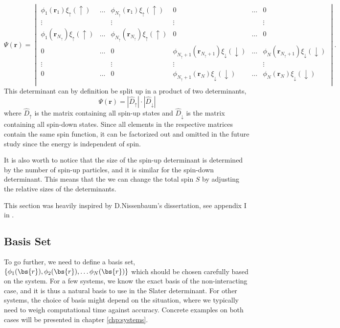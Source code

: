 \begin{equation*}
\Psi(\boldsymbol{r})=
\begin{vmatrix}
\phi_1(\boldsymbol{r}_1)\xi_{\uparrow}(\uparrow) & \hdots & \phi_{N_{\uparrow}}(\boldsymbol{r}_1)\xi_{\uparrow}(\uparrow) & 0 & \hdots & 0\\
\vdots & & \vdots & \vdots & & \vdots \\
\phi_1(\boldsymbol{r}_{N_{\uparrow}})\xi_{\uparrow}(\uparrow) & \hdots & \phi_{N_{\uparrow}}(\boldsymbol{r}_{N_{\uparrow}})\xi_{\uparrow}(\uparrow) & 0 & \hdots & 0\\
0 & \hdots & 0 & \phi_{N_{\uparrow}+1}(\boldsymbol{r}_{N_{\uparrow}+1})\xi_{\downarrow}(\downarrow) & \hdots & \phi_{N}(\boldsymbol{r}_{N_{\uparrow}+1})\xi_{\downarrow}(\downarrow)\\
\vdots & & \vdots & \vdots & & \vdots \\
0 & \hdots & 0 & \phi_{N_{\uparrow}+1}(\boldsymbol{r}_N)\xi_{\downarrow}(\downarrow) & \hdots & \phi_{N}(\boldsymbol{r}_N)\xi_{\downarrow}(\downarrow)\\
\end{vmatrix}.
\end{equation*}
This determinant can by definition be split up in a product of two determinants,
\begin{equation}
\Psi(\boldsymbol{r})=|\hat{D}_{\uparrow}|\cdot |\hat{D}_{\downarrow}|
\end{equation}
where $\hat{D}_{\uparrow}$ is the matrix containing all spin-up states and $\hat{D}_{\downarrow}$ is the matrix containing all spin-down states. Since all elements in the respective matrices contain the same spin function, it can be factorized out and omitted in the future study since the energy is independent of spin.

It is also worth to notice that the size of the spin-up determinant is determined by the number of spin-up particles, and it is similar for the spin-down determinant. This means that the we can change the total spin $S$ by adjusting the relative sizes of the determinants.

This section was heavily inspired by D.Nissenbaum's dissertation, see appendix I in \cite{nissenbaum_stochastic_2008}.

\subsection{Basis Set} \label{subsec:basisset}
To go further, we need to define a basis set, $\{\phi_1(\bs{r}),\phi_2(\bs{r}),\hdots\phi_N(\bs{r})\}$ which should be chosen carefully based on the system. For a few systems, we know the exact basis of the non-interacting case, and it is thus a natural basis to use in the Slater determinant. For other systems, the choice of basis might depend on the situation, where we typically need to weigh computational time against accuracy. Concrete examples on both cases will be presented in chapter \eqref{chp:systems}.

